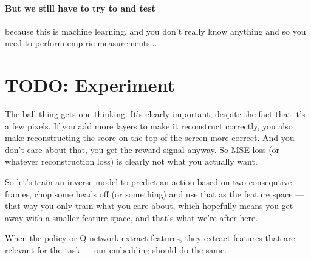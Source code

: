 \documentclass{article}
\begin{document}
\paragraph{But we still have to try to and test} because this is machine learning,
and you don't really know anything and so you need to perform empiric measurements...




\section{TODO: Experiment}
The ball thing gets one thinking.
It's clearly important, despite the fact that it's a few pixels.
If you add more layers to make it reconstruct correctly, 
you also make reconstructing the score on the top of the screen more correct. 
And you don't care about that, you get the reward signal anyway.
So MSE loss (or whatever reconstruction loss) is clearly not what you actually want.

So let's train an inverse model to predict an action based on two consequtive frames,
chop some heads off (or something) and use that as the feature space --- 
that way you only train what you care about, which hopefully
means you get away with a smaller feature space,
and that's what we're after here.

When the policy or Q-network extract features, they extract features that are relevant 
for the task --- our embedding should do the same.
\end{document}
